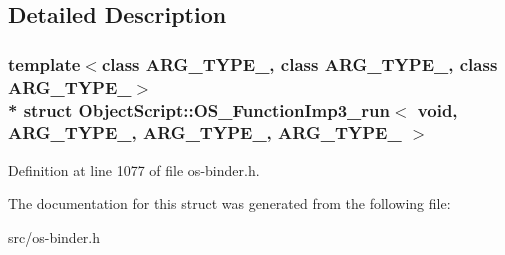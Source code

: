 \subsection{Detailed Description}
\subsubsection*{template$<$class A\+R\+G\+\_\+\+T\+Y\+P\+E\+\_, class A\+R\+G\+\_\+\+T\+Y\+P\+E\+\_, class A\+R\+G\+\_\+\+T\+Y\+P\+E\+\_$>$\\*
struct Object\+Script\+::\+O\+S\+\_\+\+Function\+Imp3\+\_\+run$<$ void,   A\+R\+G\+\_\+\+T\+Y\+P\+E\+\_, A\+R\+G\+\_\+\+T\+Y\+P\+E\+\_, A\+R\+G\+\_\+\+T\+Y\+P\+E\+\_ $>$}



Definition at line 1077 of file os-\/binder.\+h.



The documentation for this struct was generated from the following file\+:\begin{DoxyCompactItemize}
\item 
src/os-\/binder.\+h\end{DoxyCompactItemize}
